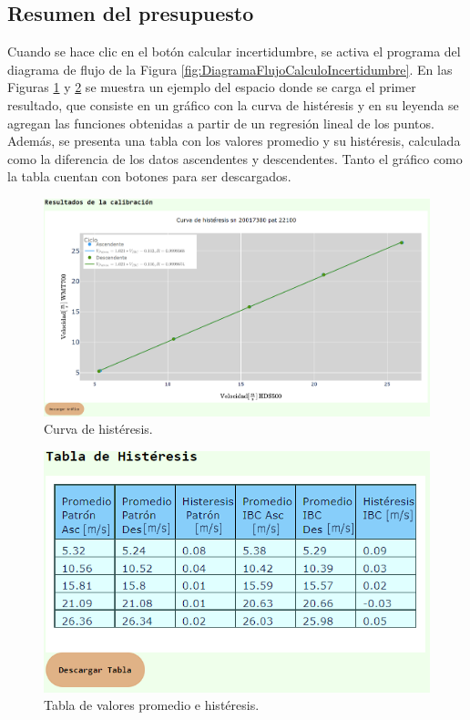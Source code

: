 \subsection{Resumen del presupuesto}\label{sec:Resultados}

Cuando se hace clic en el botón calcular incertidumbre, se activa el programa del diagrama de flujo de la Figura \ref{fig:DiagramaFlujoCalculoIncertidumbre}. En las Figuras \ref{fig:curvaHisteris} y \ref{fig:tablaHisteresis} se muestra un ejemplo del espacio donde se carga el primer resultado, que consiste en un gráfico con la curva de histéresis y en su leyenda se agregan las funciones obtenidas a partir de un regresión lineal de los puntos. Además, se presenta una tabla con los valores promedio y su histéresis, calculada como la diferencia de los datos ascendentes y descendentes. Tanto el gráfico como la tabla cuentan con botones para ser descargados.

\begin{figure}[H]
    \centering
    \includegraphics[width=1\linewidth]{Figuras/AplicacionWeb/frontend/curvaHisteris.png}
    \caption{Curva de histéresis.}
    \label{fig:curvaHisteris}
\end{figure}

\begin{figure}[H]
    \centering
    \includegraphics[width=0.55\linewidth]{Figuras/AplicacionWeb/frontend/tablaHisteresis.png}
    \caption{Tabla de valores promedio e histéresis.}
    \label{fig:tablaHisteresis}
\end{figure}

